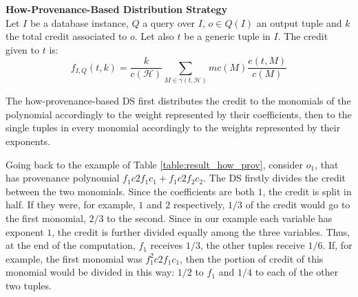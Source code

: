 \begin{definition}{\textbf{How-Provenance-Based Distribution Strategy}}
    \label{def:how_distribution}\\
    Let $I$ be a database instance, $Q$ a query over $I$, $o \in Q(I)$ an output tuple and $k$ the total credit associated to $o$. Let also $t$ be a generic tuple in $I$. The credit given to $t$ is:
    \[
    f_{I, Q}(t, k) = \frac{k}{c(\mathcal{H})} \sum_{M \in \gamma(t, \mathcal{H})} mc(M) \frac{e(t, M)}{c(M)}
    \]
\end{definition}

%

The how-provenance-based DS first distributes the credit to the monomials of the polynomial accordingly to the weight represented by their coefficients, then to the single tuples in every monomial accordingly to the weights represented by their exponents. 

Going back to the example of Table \ref{table:result_how_prov}, consider $o_1$, that has provenance polynomial $f_1 c2f_1 c_1 + f_1 c2f_2 c_2$. The DS firstly divides the credit between the two monomials. Since the coefficients are both $1$, the credit is split in half. If they were, for example, $1$ and $2$ respectively, $1/3$ of the credit would go to the first monomial, $2/3$ to the second.  
Since in our example each variable has exponent $1$, the credit is further divided equally among the three variables. Thus, at the end of the computation, $f_1$ receives $1/3$, the other tuples receive $1/6$.
If, for example, the first monomial was $f_1^2 c2f_1 c_1$, then the portion of credit of this monomial would be divided in this way: $1/2$ to $f_1$ and $1/4$ to each of the other two tuples. 


